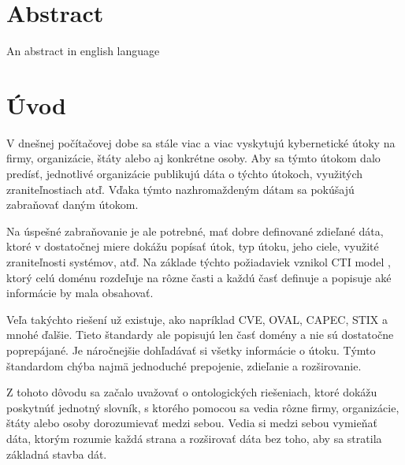 \documentclass[12pt, a4paper, oneside]{book}
\begin{document}
\chapter*{Abstract}\label{chap:abstract_en}
An abstract in english language

\tableofcontents

\mainmatter

\chapter{Úvod}\label{chap:intro}

V dnešnej počítačovej dobe sa stále viac a viac vyskytujú kybernetické útoky na firmy, organizácie, štáty alebo aj konkrétne osoby. Aby sa týmto útokom dalo predísť, jednotlivé organizácie publikujú dáta o týchto útokoch, využitých zraniteľnostiach atď. Vďaka týmto nazhromaždeným dátam sa pokúšajú zabraňovať daným útokom. 


Na úspešné zabraňovanie je ale potrebné, mať dobre definované zdieľané dáta, ktoré v dostatočnej miere dokážu popísať útok, typ útoku, jeho ciele, využité zraniteľnosti systémov, atď. Na základe týchto požiadaviek vznikol CTI model \citep{MavroeidisB17}, ktorý celú doménu rozdeľuje na rôzne časti a každú časť definuje a popisuje aké informácie by mala obsahovať. 


Veľa takýchto riešení už existuje, ako napríklad CVE\citep{cve}, OVAL\citep{oval}, CAPEC\citep{capec}, STIX\citep{stix} a mnohé ďalšie. Tieto štandardy ale popisujú len časť domény a nie sú dostatočne poprepájané. Je náročnejšie dohľadávať si všetky informácie o útoku. Týmto štandardom chýba najmä jednoduché prepojenie, zdieľanie a rozširovanie.



Z tohoto dôvodu sa začalo uvažovať o ontologických riešeniach, ktoré dokážu poskytnúť jednotný slovník, s ktorého pomocou sa vedia rôzne firmy, organizácie, štáty alebo osoby dorozumievať medzi sebou. Vedia si medzi sebou vymieňať dáta, ktorým rozumie každá strana a rozširovať dáta bez toho, aby sa stratila základná stavba dát.
\end{document}

